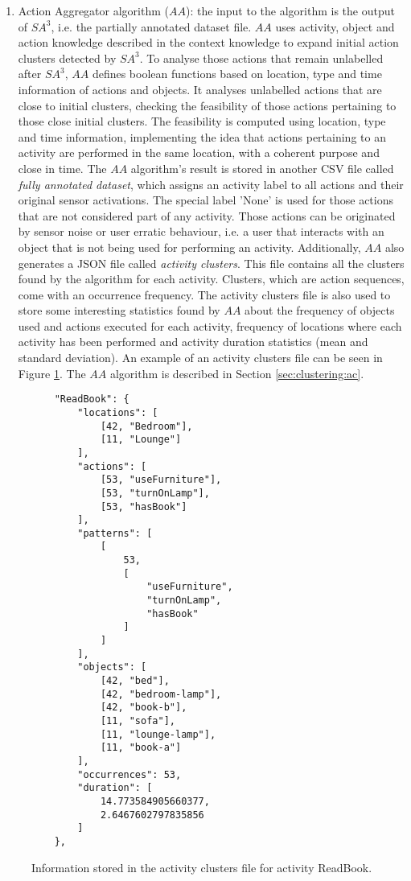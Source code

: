 \begin{enumerate}
 \item Action Aggregator algorithm ($AA$): the input to the algorithm is the output of $SA^3$, i.e. the partially annotated dataset file. $AA$ uses activity, object and action knowledge described in the context knowledge to expand initial action clusters detected by $SA^3$. To analyse those actions that remain unlabelled after $SA^3$, $AA$ defines boolean functions based on location, type and time information of actions and objects. It analyses unlabelled actions that are close to initial clusters, checking the feasibility of those actions pertaining to those close initial clusters. The feasibility is computed using location, type and time information, implementing the idea that actions pertaining to an activity are performed in the same location, with a coherent purpose and close in time. The $AA$ algorithm's result is stored in another CSV file called \textit{fully annotated dataset}, which assigns an activity label to all actions and their original sensor activations. The special label 'None' is used for those actions that are not considered part of any activity. Those actions can be originated by sensor noise or user erratic behaviour, i.e. a user that interacts with an object that is not being used for performing an activity. Additionally, $AA$ also generates a JSON file called \textit{activity clusters}. This file contains all the clusters found by the algorithm for each activity. Clusters, which are action sequences, come with an occurrence frequency. The activity clusters file is also used to store some interesting statistics found by $AA$ about the frequency of objects used and actions executed for each activity, frequency of locations where each activity has been performed and activity duration statistics (mean and standard deviation). An example of an activity clusters file can be seen in Figure \ref{fig-clusters-file}. The $AA$ algorithm is described in Section \ref{sec:clustering:ac}.
\end{enumerate}

\begin{figure}[htbp]
\begin{small}
\begin{lstlisting}
    "ReadBook": {
        "locations": [
            [42, "Bedroom"], 
            [11, "Lounge"]
        ], 
        "actions": [
            [53, "useFurniture"], 
            [53, "turnOnLamp"], 
            [53, "hasBook"]
        ], 
        "patterns": [
            [
                53, 
                [
                    "useFurniture", 
                    "turnOnLamp", 
                    "hasBook"
                ]
            ]
        ], 
        "objects": [
            [42, "bed"], 
            [42, "bedroom-lamp"], 
            [42, "book-b"], 
            [11, "sofa"], 
            [11, "lounge-lamp"], 
            [11, "book-a"]
        ], 
        "occurrences": 53, 
        "duration": [
            14.773584905660377, 
            2.6467602797835856
        ]
    }, 
\end{lstlisting}
\end{small}
\caption{Information stored in the activity clusters file for activity ReadBook.}
\label{fig-clusters-file}
\end{figure}

